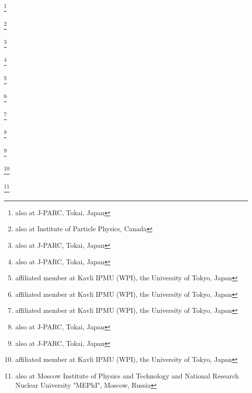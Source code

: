 \author{P.\,Hamilton}\INSTEI
\author{D.\,Hansen}\INSTGC
\author{T.\,Hara}\INSTCC
\author{M.\,Hartz}\INSTHA\INSTB
\author{T.\,Hasegawa}\thanks{also at J-PARC, Tokai, Japan}\INSTCB
\author{N.C.\,Hastings}\INSTE
\author{Y.\,Hayato}\INSTBJ\INSTHA
\author{C.\,Hearty}\thanks{also at Institute of Particle Physics, Canada}\INSTD
\author{R.L.\,Helmer}\INSTB
\author{M.\,Hierholzer}\INSTEE
\author{J.\,Hignight}\INSTFJ
\author{A.\,Hillairet}\INSTG
\author{A.\,Himmel}\INSTFH
\author{T.\,Hiraki}\INSTCD
\author{S.\,Hirota}\INSTCD
\author{J.\,Holeczek}\INSTDI
\author{S.\,Horikawa}\INSTEF
\author{K.\,Huang}\INSTCD
\author{A.K.\,Ichikawa}\INSTCD
\author{K.\,Ieki}\INSTCD
\author{M.\,Ieva}\INSTED
\author{M.\,Ikeda}\INSTBJ
\author{J.\,Imber}\INSTFJ
\author{J.\,Insler}\INSTFI
\author{T.J.\,Irvine}\INSTCG
\author{T.\,Ishida}\thanks{also at J-PARC, Tokai, Japan}\INSTCB
\author{T.\,Ishii}\thanks{also at J-PARC, Tokai, Japan}\INSTCB
\author{S.J.\,Ives}\INSTEI
\author{E.\,Iwai}\INSTCB
\author{K.\,Iwamoto}\INSTGD
\author{K.\,Iyogi}\INSTBJ
\author{A.\,Izmaylov}\INSTEC\INSTEB
\author{A.\,Jacob}\INSTGG
\author{B.\,Jamieson}\INSTGH
\author{R.A.\,Johnson}\INSTGB
\author{S.\,Johnson}\INSTGB
\author{J.H.\,Jo}\INSTFJ
\author{P.\,Jonsson}\INSTEI
\author{C.K.\,Jung}\thanks{affiliated member at Kavli IPMU (WPI), the University of Tokyo, Japan}\INSTFJ
\author{M.\,Kabirnezhad}\INSTDF
\author{A.C.\,Kaboth}\INSTEI
\author{T.\,Kajita}\thanks{affiliated member at Kavli IPMU (WPI), the University of Tokyo, Japan}\INSTCG
\author{H.\,Kakuno}\INSTGI
\author{J.\,Kameda}\INSTBJ
\author{Y.\,Kanazawa}\INSTCH
\author{D.\,Karlen}\INSTG\INSTB
\author{I.\,Karpikov}\INSTEB
\author{T.\,Katori}\INSTFA
\author{E.\,Kearns}\thanks{affiliated member at Kavli IPMU (WPI), the University of Tokyo, Japan}\INSTFE\INSTHA
\author{M.\,Khabibullin}\INSTEB
\author{A.\,Khotjantsev}\INSTEB
\author{D.\,Kielczewska}\INSTDJ
\author{T.\,Kikawa}\INSTCD
\author{A.\,Kilinski}\INSTDF
\author{J.\,Kim}\INSTD
\author{S.\,King}\INSTFA
\author{J.\,Kisiel}\INSTDI
\author{P.\,Kitching}\INSTC
\author{T.\,Kobayashi}\thanks{also at J-PARC, Tokai, Japan}\INSTCB
\author{L.\,Koch}\INSTBC
\author{A.\,Kolaceke}\INSTE
\author{A.\,Konaka}\INSTB
\author{L.L.\,Kormos}\INSTEJ
\author{A.\,Korzenev}\INSTEG
\author{K.\,Koseki}\thanks{also at J-PARC, Tokai, Japan}\INSTCB
\author{Y.\,Koshio}\thanks{affiliated member at Kavli IPMU (WPI), the University of Tokyo, Japan}\INSTGJ
\author{I.\,Kreslo}\INSTEE
\author{W.\,Kropp}\INSTGA
\author{H.\,Kubo}\INSTCD
\author{Y.\,Kudenko}\thanks{also at Moscow Institute of Physics and Technology and National Research Nuclear University "MEPhI", Moscow, Russia}\INSTEB
